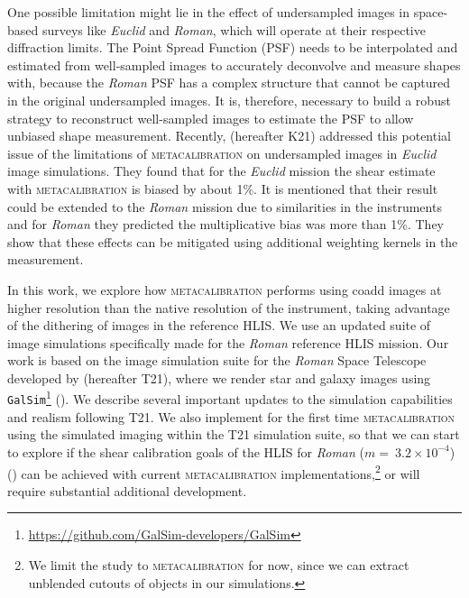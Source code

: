 \documentclass[fleqn,usenatbib]{mnras}
\begin{document}
One possible limitation might lie in the effect of undersampled images in space-based surveys like \emph{Euclid} and \emph{Roman}, which will operate at their respective diffraction limits. The Point Spread Function (PSF) needs to be interpolated and estimated from well-sampled images to accurately deconvolve and measure shapes with, because the \emph{Roman} PSF has a complex structure that cannot be captured in the original undersampled images. It is, therefore, necessary to build a robust strategy to reconstruct well-sampled images to estimate the PSF to allow unbiased shape measurement.
Recently, \cite{2021MNRAS.502.4048K} (hereafter K21) addressed this potential issue of the limitations of \textsc{metacalibration} on undersampled images in \emph{Euclid} image simulations. They found that for the \emph{Euclid} mission the shear estimate with \textsc{metacalibration} is biased by about 1$\%$. It is mentioned that their result could be extended to the \emph{Roman} mission due to similarities in the instruments and for \emph{Roman} they predicted the multiplicative bias was more than 1\%. They show that these effects can be mitigated using additional weighting kernels in the measurement. 

In this work, we explore how \textsc{metacalibration} performs using coadd images at higher resolution than the native resolution of the instrument, taking advantage of the dithering of images in the reference HLIS. We use an updated suite of image simulations specifically made for the \emph{Roman} reference HLIS mission. Our work is based on the image simulation suite for the \emph{Roman} Space Telescope developed by \cite{2021MNRAS.501.2044T} (hereafter T21), where we render star and galaxy images using \texttt{GalSim}\footnote{\url{ https://github.com/GalSim-developers/GalSim}} (\citealt{2015A&C....10..121R}). We describe several important updates to the simulation capabilities and realism following T21. We also implement for the first time \textsc{metacalibration} using the simulated imaging within the T21 simulation suite, so that we can start to explore if the shear calibration goals of the HLIS for \emph{Roman} ($m=~3.2\times10^{-4}$) (\citealt{2018arXiv180403628D}) can be achieved with current \textsc{metacalibration} implementations,\footnote{We limit the study to \textsc{metacalibration} for now, since we can extract unblended cutouts of objects in our simulations.} or will require substantial additional development. \par
\end{document}
